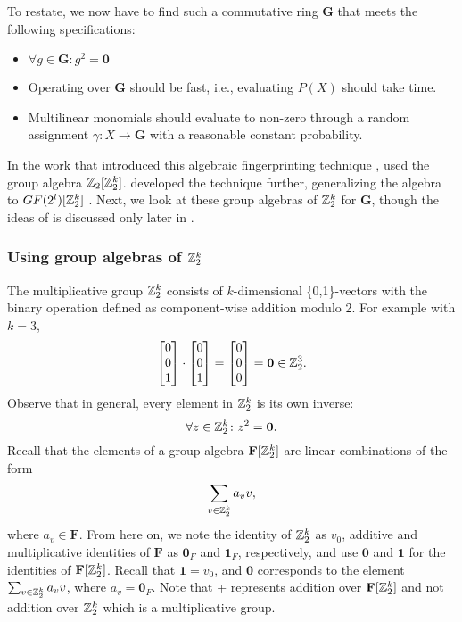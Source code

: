 To restate, we now have to find such a commutative ring $\mathbf{G}$ that 
meets the following specifications: 
\begin{itemize}
  \item $\forall g \in \mathbf{G} \colon g^2 = \mathbf{0}$
  \item Operating over $\mathbf{G}$ should be fast, i.e., evaluating 
  $P(X)$ should take  time.
  \item Multilinear monomials should evaluate to non-zero
  through a random assignment 
  $\gamma \colon X \to \mathbf{G}$ with a reasonable constant probability.
\end{itemize}

In the work that introduced 
this algebraic fingerprinting technique \cite{Koutis08}, 
\citeauthor{Koutis08} used the group algebra $\mathbb Z_2[\mathbb Z_2^k]$. 
\citeauthor{Williams09} developed the technique further, 
generalizing the algebra to $GF(2^{l})[\mathbb Z_2^k]$ \cite{Williams09}. 
Next, we look at these group algebras of $\mathbb Z_2^k$ for $\mathbf{G}$, 
though the ideas of \citeauthor{Williams09} is discussed only 
later in .

\subsubsection{Using group algebras of $\mathbb Z_2^k$}

The multiplicative group $\mathbb Z_2^k$ consists of $k$-dimensional \{0,1\}-vectors 
with the binary operation defined as component-wise addition modulo 2. 
For example with $k = 3$, 
\[
  \begin{bmatrix} 0 \\ 0 \\ 1 \end{bmatrix} \cdot 
  \begin{bmatrix} 0 \\ 0 \\ 1 \end{bmatrix} =
  \begin{bmatrix} 0 \\ 0 \\ 0 \end{bmatrix} = \mathbf{0} \in \mathbb Z_2^3.
\]
Observe that in general, every element in $\mathbb Z_2^k$ is its own inverse:
\begin{equation}
  \label{eq:Z_2^k has char 2}
  \forall z \in \mathbb Z_2^k \colon z^2 = \mathbf{0}.
\end{equation}
Recall that the elements of a group algebra 
$\mathbf{F}[\mathbb Z_2^k]$ are linear combinations of the form 
\[
  \displaystyle \sum_{v \in \mathbb Z_2^k}a_v v,
\]
where $a_v \in \mathbf{F}$. From here on, we note the identity of $\mathbb Z_2^k$ as $v_0$, additive and 
multiplicative identities of $\mathbf{F}$ as $\mathbf{0}_F$ and $\mathbf{1}_F$, respectively, and 
use $\mathbf{0}$ and $\mathbf{1}$ for the identities of 
$\mathbf{F}[\mathbb Z_2^k]$. Recall that $\mathbf{1} = v_0$, and
$\mathbf{0}$ corresponds to the element $\sum_{v \in \mathbb Z_2^k}a_v v$, where $a_v =
\mathbf{0}_F$. Note that + represents addition over $\mathbf{F}[\mathbb Z_2^k]$ and not 
addition over $\mathbb Z_2^k$ which is a multiplicative group.

